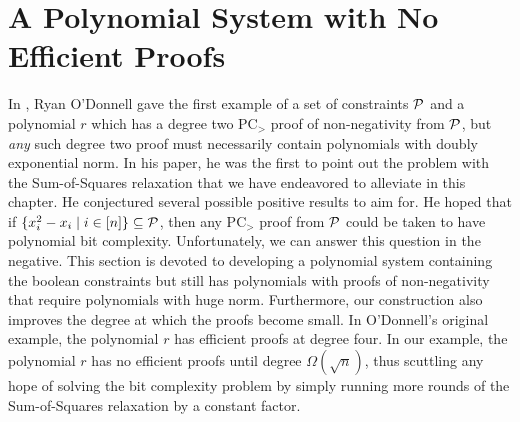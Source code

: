 \section{A Polynomial System with No Efficient Proofs}
In \cite{ODon16}, Ryan O'Donnell gave the first example of a set of constraints $\mathcal P$ and a polynomial $r$ which has a degree two PC$_>$ proof of non-negativity from $\mathcal P$, but \emph{any} such degree two proof must necessarily contain polynomials with doubly exponential norm. In his paper, he was the first to point out the problem with the Sum-of-Squares relaxation that we have endeavored to alleviate in this chapter. He conjectured several possible positive results to aim for. He hoped that if $\{x_i^2 - x_i \mid i \in [n]\} \subseteq \mathcal P$, then any PC$_>$ proof from $\mathcal P$ could be taken to have polynomial bit complexity. Unfortunately, we can answer this question in the negative. This section is devoted to developing a polynomial system containing the boolean constraints but still has polynomials with proofs of non-negativity that require polynomials with huge norm. Furthermore, our construction also improves the degree at which the proofs become small. In O'Donnell's original example, the polynomial $r$ has efficient proofs at degree four. In our example, the polynomial $r$ has no efficient proofs until degree $\Omega(\sqrt{n})$, thus scuttling any hope of solving the bit complexity problem by simply running more rounds of the Sum-of-Squares relaxation by a constant factor.


